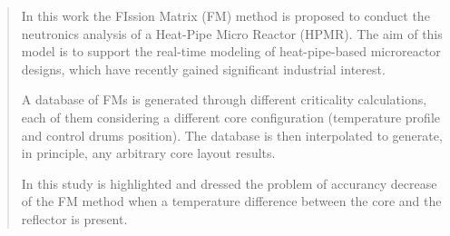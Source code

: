\documentclass[preprint,review,12pt]{elsarticle}
\begin{document}
\begin{frontmatter}



\begin{abstract}

In this work the FIssion Matrix (FM) method is proposed to conduct the neutronics analysis of a Heat-Pipe Micro Reactor (HPMR). The aim of this model is to support the real-time modeling of heat-pipe-based microreactor designs, which have recently gained significant industrial interest. 

A database of FMs is generated through different criticality calculations, each of them considering a different core configuration (temperature profile and control drums position). The database is then interpolated to generate, in principle, any arbitrary core layout results.

In this study is highlighted and dressed the problem of accurancy decrease of the FM method when a temperature difference between the core and the reflector is present.    





\end{abstract}
\end{frontmatter}
\end{document}
